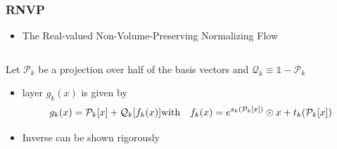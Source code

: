 \begin{frame}
    \frametitle{RNVP}
    \begin{itemize}
        \setlength\itemsep{.6em}
        \item The Real-valued Non-Volume-Preserving Normalizing Flow
    \end{itemize}
    \begin{columns}
        \begin{column}[t]{0.48\textwidth}
            \item Let $\mathcal{P}_k$ be a projection over half of the basis vectors and $\mathcal{Q}_k \equiv \mathbb{1} - \mathcal{P}_k$
            \begin{itemize}
                \item layer $g_k(x)$ is given by 
                \begin{equation}
                    g_k(x) = \mathcal{P}_k[x] + \mathcal{Q}_k [f_k(x)] \quad \\
                    \text{with} \quad f_k(x) =  e^{s_k(\mathcal{P}_k[x])} \odot x + t_k(\mathcal{P}_k[x])
                    \label{eq:layer_RNVP}
                \end{equation}
                \setlength\itemsep{.6em}
                \item Inverse can be shown rigorously
            \end{itemize}
        \end{column}


\end{columns}
\end{frame}

